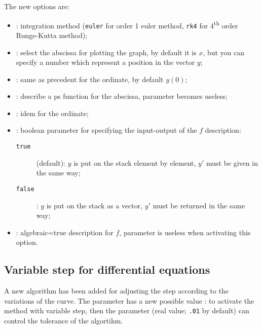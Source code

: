 \documentclass[11pt,english,BCOR10mm,DIV12,bibliography=totoc,parskip=false,smallheadings
    headexclude,footexclude,oneside]{pst-doc}
\begin{document}
The new options are:


\begin{itemize}\setlength\itemsep{0pt}\setlength\parsep{0pt}\setlength\parskip{0pt}
\item {}: integration method (\verb+euler+ for order 1 euler method, \verb+rk4+ for
  4\textsuperscript{th} order Runge-Kutta method);
\item {}: select the abscissa for plotting the graph, by default it is
  $x$, but you can specify a number which represent a position in the vector $y$;
\item {}: same as precedent for the ordinate, by default $y(0)$;
\item {}: describe a ps function for the abscissa, parameter
   becomes useless;
\item {}: idem for the ordinate;
\item {}: boolean parameter for specifying the input-output of the
  $f$ description:
  \begin{description}
  \item[\texttt{true}] (default): $y$ is put on the stack element by element, $y'$
    must be given in the same way;
  \item[\texttt{false}]: $y$ is put on the stack as a vector, $y'$ must be returned
  in the same way;
  \end{description}

\item {}: algebraic=true description for $f$, 
  parameter is useless when activating this option.
\end{itemize}



\clearpage
\subsection{Variable step for differential equations}

A new algorithm has been added for adjusting the step according to the variations of
the curve. The parameter  has a new possible value :  to
activate the  method with variable step, then the parameter
 (real value; \verb+.01+ by default) can control the tolerance of
the algortihm.
\end{document}
